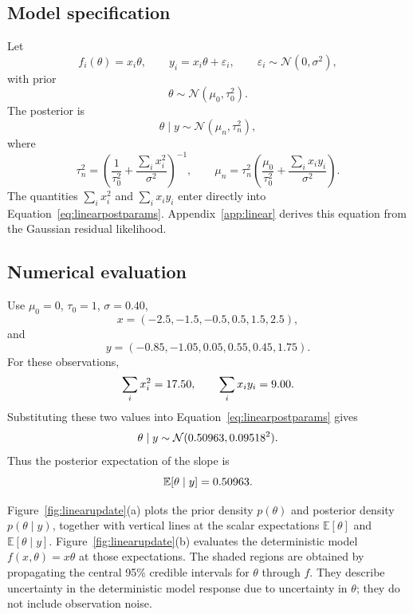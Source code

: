 \documentclass[11pt,a4paper]{article}
\begin{document}
\subsection{Model specification}
Let
\begin{equation}
 f_i(\theta)=x_i\theta,
 \qquad
 y_i=x_i\theta+\varepsilon_i,
 \qquad
 \varepsilon_i\sim\mathcal N(0,\sigma^2),
 \label{eq:linearforward}
\end{equation}
with prior
\begin{equation}
 \theta\sim\mathcal N(\mu_0,\tau_0^2).
\end{equation}
The posterior is
\begin{equation}
 \theta\mid y\sim\mathcal N(\mu_n,\tau_n^2),
\end{equation}
where
\begin{equation}
 \tau_n^2=
 \left(\frac{1}{\tau_0^2}+\frac{\sum_i x_i^2}{\sigma^2}\right)^{-1},
 \qquad
 \mu_n=\tau_n^2
 \left(\frac{\mu_0}{\tau_0^2}+\frac{\sum_i x_i y_i}{\sigma^2}\right).
 \label{eq:linearpostparams}
\end{equation}
The quantities \(\sum_i x_i^2\) and \(\sum_i x_i y_i\) enter directly into Equation~\eqref{eq:linearpostparams}. Appendix~\ref{app:linear} derives this equation from the Gaussian residual likelihood.

\subsection{Numerical evaluation}
Use \(\mu_0=0\), \(\tau_0=1\), \(\sigma=0.40\),
\begin{equation}
 x=(-2.5,-1.5,-0.5,0.5,1.5,2.5),
\end{equation}
and
\begin{equation}
 y=(-0.85,-1.05,0.05,0.55,0.45,1.75).
\end{equation}
For these observations,
\begin{equation}
 \sum_i x_i^2=17.50,
 \qquad
 \sum_i x_i y_i=9.00.
\end{equation}
Substituting these two values into Equation~\eqref{eq:linearpostparams} gives
\begin{equation}
 \theta\mid y\sim\mathcal N(0.50963,0.09518^2).
 \label{eq:linearpostnumeric}
\end{equation}
Thus the posterior expectation of the slope is
\begin{equation}
 \mathbb E[\theta\mid y]=0.50963.
\end{equation}

Figure~\ref{fig:linearupdate}(a) plots the prior density \(p(\theta)\) and posterior density \(p(\theta\mid y)\), together with vertical lines at the scalar expectations \(\mathbb E[\theta]\) and \(\mathbb E[\theta\mid y]\). Figure~\ref{fig:linearupdate}(b) evaluates the deterministic model \(f(x,\theta)=x\theta\) at those expectations. The shaded regions are obtained by propagating the central 95\% credible intervals for \(\theta\) through \(f\). They describe uncertainty in the deterministic model response due to uncertainty in \(\theta\); they do not include observation noise.
\end{document}
